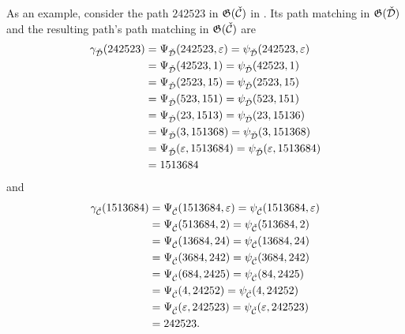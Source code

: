 As an example, consider the path $242523$ in $\mathfrak{G}(\check{\mathcal{C}})$ in . Its path matching in $\mathfrak{G}(\check{\mathcal{D}})$ and the resulting path's path matching in $\mathfrak{G}(\check{\mathcal{C}})$ are
\begin{align*}
    \gamma_{\check{\mathcal{D}}}(242523) &= \Psi_{\check{\mathcal{D}}}(242523, \varepsilon) = \psi_{\check{\mathcal{D}}}(242523, \varepsilon)\\
    &= \Psi_{\check{\mathcal{D}}}(42523,1) = \psi_{\check{\mathcal{D}}}(42523,1)\\
    &= \Psi_{\check{\mathcal{D}}}(2523,15) = \psi_{\check{\mathcal{D}}}(2523,15)\\
    &= \Psi_{\check{\mathcal{D}}}(523,151) = \psi_{\check{\mathcal{D}}}(523,151)\\
    &= \Psi_{\check{\mathcal{D}}}(23,1513) = \psi_{\check{\mathcal{D}}}(23,15136)\\
    &= \Psi_{\check{\mathcal{D}}}(3,151368) = \psi_{\check{\mathcal{D}}}(3,151368)\\
    &= \Psi_{\check{\mathcal{D}}}(\varepsilon,1513684) = \psi_{\check{\mathcal{D}}}(\varepsilon,1513684)\\
    &= 1513684
\end{align*}
and
\begin{align*}
    \gamma_{\check{\mathcal{C}}}(1513684) &= \Psi_{\check{\mathcal{C}}}(1513684, \varepsilon) = \psi_{\check{\mathcal{C}}}(1513684, \varepsilon)\\
    &= \Psi_{\check{\mathcal{C}}}(513684, 2) = \psi_{\check{\mathcal{C}}}(513684, 2)\\
    &= \Psi_{\check{\mathcal{C}}}(13684, 24) = \psi_{\check{\mathcal{C}}}(13684, 24)\\
    &= \Psi_{\check{\mathcal{C}}}(3684, 242) = \psi_{\check{\mathcal{C}}}(3684, 242)\\
    &= \Psi_{\check{\mathcal{C}}}(684, 2425) = \psi_{\check{\mathcal{C}}}(84, 2425)\\
    &= \Psi_{\check{\mathcal{C}}}(4, 24252) = \psi_{\check{\mathcal{C}}}(4, 24252)\\
    &= \Psi_{\check{\mathcal{C}}}(\varepsilon, 242523) = \psi_{\check{\mathcal{C}}}(\varepsilon, 242523)\\
    &= 242523.
\end{align*}

